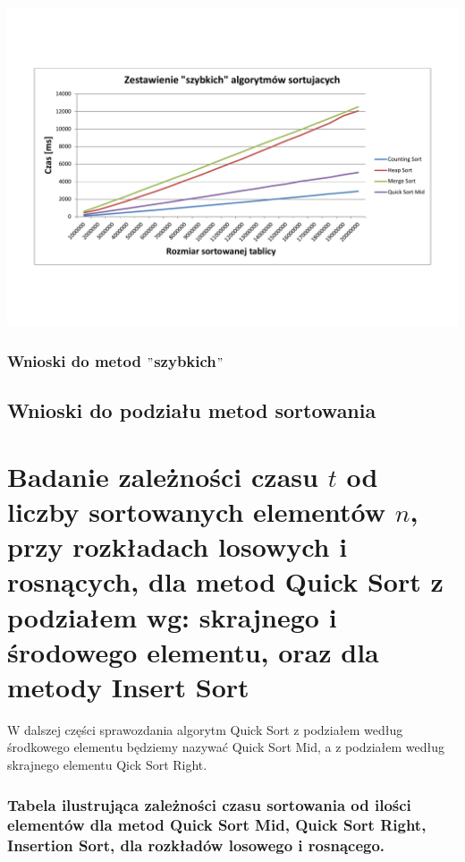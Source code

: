 \documentclass[polish,polish,a4paper]{article}
\begin{document}
\begin{spacing}{1.5}
	\begin{minipage}[H]{\textwidth}
	\begin{center}
		\includegraphics[scale=0.6]{zad2szybkie.pdf}
		\label{fig:zad2szybkie}
	\end{center}
\end{minipage}

\subsubsection{Wnioski do metod $"$szybkich$"$}


\subsection{Wnioski do podziału metod sortowania}

\section{Badanie zależności czasu $t$ od liczby sortowanych elementów $n$, przy rozkładach losowych i rosnących, dla metod Quick Sort z podziałem wg: skrajnego i środowego elementu, oraz dla metody Insert Sort}

W dalszej części sprawozdania algorytm Quick Sort z podziałem według środkowego elementu będziemy nazywać Quick Sort Mid, a z podziałem według skrajnego elementu Qick Sort Right.


	\subsubsection*{Tabela ilustrująca zależności czasu sortowania od ilości elementów dla metod Quick Sort Mid, Quick Sort Right, Insertion Sort, dla rozkładów losowego i rosnącego.}



\end{spacing}
\end{document}
